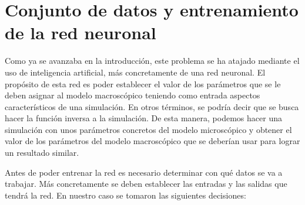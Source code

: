 \section{Conjunto de datos y entrenamiento de la red neuronal}

Como ya se avanzaba en la introducción, este problema se ha atajado mediante el uso de inteligencia artificial, más concretamente de una red neuronal. El propósito de esta red es poder establecer el valor de los parámetros que se le deben asignar al modelo macroscópico teniendo como entrada aspectos característicos de una simulación. En otros términos, se podría decir que se busca hacer la función inversa a la simulación. De esta manera, podemos hacer una simulación con unos parámetros concretos del modelo microscópico y obtener el valor de los parámetros del modelo macroscópico que se deberían usar para lograr un resultado similar. 

Antes de poder entrenar la red es necesario determinar con qué datos se va a trabajar. Más concretamente se deben establecer las entradas y las salidas que tendrá la red. En nuestro caso se tomaron las siguientes decisiones:


